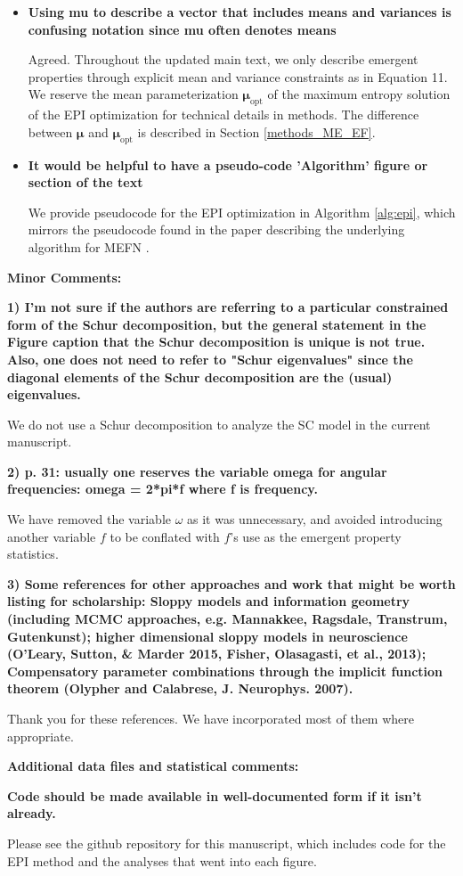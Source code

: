 \documentclass[11pt,a4paper]{article}
\begin{document}
\begin{itemize}
\item \textbf{Using mu to describe a vector that includes means and variances is confusing notation since mu often denotes means }

Agreed. Throughout the updated main text, we only describe emergent properties through explicit mean and variance constraints as in Equation 11.
We reserve the mean parameterization $\bm{\mu}_{\text{opt}}$ of the maximum entropy solution of the EPI optimization for technical details in methods.
The difference between $\bm{\mu}$ and $\bm{\mu}_{\text{opt}}$ is described in Section \ref{methods_ME_EF}.

\item \textbf{It would be helpful to have a pseudo-code 'Algorithm' figure or section of the text}

We provide pseudocode for the EPI optimization in Algorithm \ref{alg:epi}, which mirrors the pseudocode found in the paper describing the underlying algorithm for MEFN \cite{loaiza2017maximum}.

\end{itemize}


\textbf{Minor Comments: }

\textbf{1) I'm not sure if the authors are referring to a particular constrained form of the Schur decomposition, but the general statement in the Figure caption that the Schur decomposition is unique is not true. Also, one does not need to refer to "Schur eigenvalues" since the diagonal elements of the Schur decomposition are the (usual) eigenvalues. }

We do not use a Schur decomposition to analyze the SC model in the current manuscript.

\textbf{2) p. 31: usually one reserves the variable omega for angular frequencies: omega = 2*pi*f where f is frequency. }

We have removed the variable $\omega$ as it was unnecessary, and avoided introducing another variable $f$ to be conflated with $f$'s use as the emergent property statistics.

\textbf{3) Some references for other approaches and work that might be worth listing for scholarship: Sloppy models and information geometry (including MCMC approaches, e.g. Mannakkee, Ragsdale, Transtrum, Gutenkunst); higher dimensional sloppy models in neuroscience (O'Leary, Sutton, \& Marder 2015, Fisher, Olasagasti, et al., 2013); Compensatory parameter combinations through the implicit function theorem (Olypher and Calabrese, J. Neurophys. 2007). }

Thank you for these references. We have incorporated most of them where appropriate.

\textbf{Additional data files and statistical comments:}

\textbf{Code should be made available in well-documented form if it isn't already. }

Please see the github repository for this manuscript, which includes code for the EPI method and the analyses that went into each figure.
\end{document}
